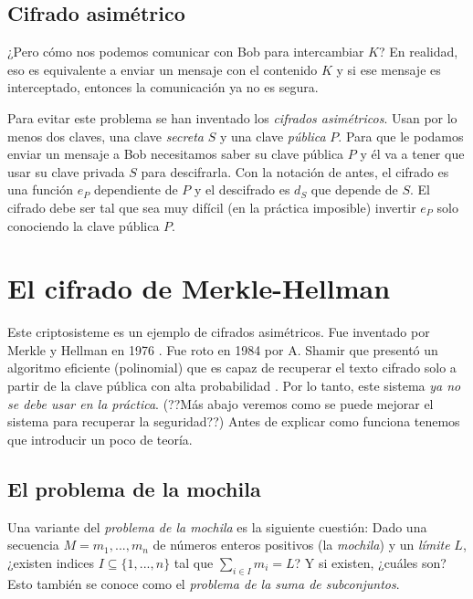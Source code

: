 \documentclass[12pt]{article}
\begin{document}
\subsection*{Cifrado asimétrico}

¿Pero cómo nos podemos comunicar con Bob para intercambiar $K$? En realidad, eso es equivalente a enviar un mensaje con el contenido $K$ y si ese mensaje es interceptado, entonces la comunicación ya no es segura.

Para evitar este problema se han inventado los \emph{cifrados asimétricos}. Usan por lo menos dos claves, una clave \emph{secreta} $S$ y una clave \emph{pública} $P$. Para que le podamos enviar un mensaje a Bob necesitamos saber su clave pública $P$ y él va a tener que usar su clave privada $S$ para descifrarla. Con la notación de antes, el cifrado es una función $e_P$ dependiente de $P$ y el descifrado es $d_S$ que depende de $S$. El cifrado debe ser tal que sea muy difícil (en la práctica imposible) invertir $e_P$ solo conociendo la clave pública $P$.

\section{El cifrado de Merkle-Hellman}

Este criptosisteme es un ejemplo de cifrados asimétricos. Fue inventado por Merkle y Hellman en 1976 \cite{merkle1978}. Fue roto en 1984 por A. Shamir que presentó un algoritmo eficiente (polinomial) que es capaz de recuperar el texto cifrado solo a partir de la clave pública con alta probabilidad \cite{shamir1984}. Por lo tanto, este sistema \emph{ya no se debe usar en la práctica}. (??Más abajo veremos como se puede mejorar el sistema para recuperar la seguridad??) Antes de explicar como funciona tenemos que introducir un poco de teoría.

\subsection*{El problema de la mochila}

Una variante del \emph{problema de la mochila} es la siguiente cuestión: Dado una secuencia $M = m_1, ..., m_n$ de números enteros positivos (la \emph{mochila}) y un \emph{límite} $L$, ¿existen indices $I \subseteq \{1,...,n\}$ tal que $\sum_{i \in I}m_i = L$? Y si existen, ¿cuáles son? Esto también se conoce como el \emph{problema de la suma de subconjuntos}.
\end{document}
